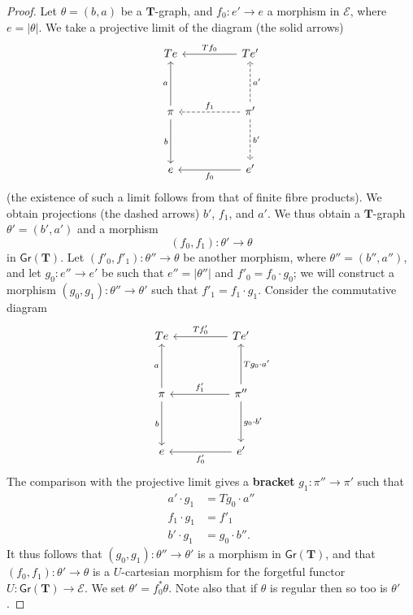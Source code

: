 \documentclass[fleqn]{article}
\newcommand{\oldpage}[1]{\marginpar{\footnotesize$\Big\vert$ \textit{p.~#1}}}
\newcommand{\unsure}[1]{{\color{purple}\textbf{#1}}}
\newcommand{\TT}{\mathbf{T}}
\newcommand{\cat}[1]{\mathcal{#1}}
\newcommand{\Cat}[1]{\mathsf{#1}}
\newcommand{\set}[1]{|#1|}
\newcommand{\Gr}[1]{\Cat{Gr}(#1)}
\begin{document}
\begin{proof}
  Let $\theta=(b,a)$ be a $\TT$-graph, and $f_0\colon e'\to e$ a morphism in $\cat{E}$, where $e=\set{\theta}$.
  We take a projective limit of the diagram (the solid arrows)
  \[
    \begin{tikzcd}[sep=huge]
      Te
    & Te'
        \ar[l,swap,"Tf_0"]
    \\\pi
        \ar[u,"a"]
        \ar[d,swap,"b"]
    & \pi'
        \ar[u,dashed,swap,"a'"]
        \ar[l,dashed,swap,"f_1"]
        \ar[d,dashed,"b'"]
    \\e
    & e'
        \ar[l,"f_0"]
    \end{tikzcd}
  \]
  (the existence of such a limit follows from that of finite fibre products).
  We obtain projections (the dashed arrows) $b'$, $f_1$, and $a'$.
  We thus obtain a $\TT$-graph $\theta'=(b',a')$ and a morphism
  \[
    (f_0,f_1)\colon\theta'\to\theta
  \]
  in $\Gr{\TT}$.
  Let $(f'_0,f'_1)\colon\theta''\to\theta$ be another morphism, where $\theta''=(b'',a'')$, and let $g_0\colon e''\to e'$ be such that $e''=\set{\theta''}$ and $f'_0=f_0\cdot g_0$;
  we will construct a morphism $(g_0,g_1)\colon\theta''\to\theta'$ such that $f'_1=f_1\cdot g_1$.
  Consider the commutative diagram
  \[
    \begin{tikzcd}[sep=huge]
      Te
    & Te'
        \ar[l,swap,"Tf'_0"]
    \\\pi
        \ar[u,"a"]
        \ar[d,swap,"b"]
    & \pi''
        \ar[u,swap,"Tg_0\cdot a'"]
        \ar[l,swap,"f'_1"]
        \ar[d,"g_0\cdot b'"]
    \\e
    & e'
        \ar[l,"f'_0"]
    \end{tikzcd}
  \]
  \oldpage{236}
  The comparison with the projective limit gives a \unsure{bracket} $g_1\colon\pi''\to\pi'$ such that
  \[
    \begin{aligned}
      a'\cdot g_1
    & = Tg_0\cdot a''
    \\f_1\cdot g_1
    & = f'_1
    \\b'\cdot g_1
    & = g_0\cdot b''.
    \end{aligned}
  \]
  It thus follows that $(g_0,g_1)\colon\theta''\to\theta'$ is a morphism in $\Gr{\TT}$, and that $(f_0,f_1)\colon\theta'\to\theta$ is a $U$-cartesian morphism for the forgetful functor $U\colon\Gr{\TT}\to\cat{E}$.
  We set $\theta'=f_0^*\theta$.
  Note also that if $\theta$ is regular then so too is $\theta'$.


\end{proof}
\end{document}
